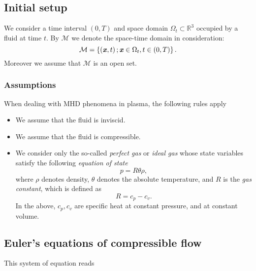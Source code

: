 \subsection{Initial setup}

We consider a time interval $\left(0,T\right)$ and space domain $\Omega_{t}\subset \mathbb{R}^3$ occupied by a fluid at time $t$.
By $\mathcal{M}$ we denote the space-time domain in consideration: 
\begin{equation}\label{M}
\mathcal{M}=\left\{\left(\textbf{\textit{x}},t\right);\\\textbf{\textit{x}}\in\Omega_{t},t\in\left(0,T\right)\right \}.
\end{equation}
Moreover we assume that $\mathcal{M}$ is an open set.

\subsubsection{Assumptions}
When dealing with MHD phenomena in plasma, the following rules apply
\begin{itemize}
    \item We assume that the fluid is inviscid.
    \item We assume that the fluid is compressible.
    \item We consider only the so-called \textit{perfect gas} or \textit{ideal gas} whose state variables satisfy the following \textit{equation of state}
    \begin{equation}\label{start_therm}
    p = R\theta\rho,
    \end{equation}
    where $\rho$ denotes density, $\theta$ denotes the absolute temperature, and $R$ is the \textit{gas constant}, which is defined as 
    \begin{equation}
    R = c_p - c_v.
    \end{equation}
    In the above, $c_p, c_v$ are specific heat at constant pressure, and at constant volume.
\end{itemize}

\subsection{Euler's equations of compressible flow}
This system of equation reads

